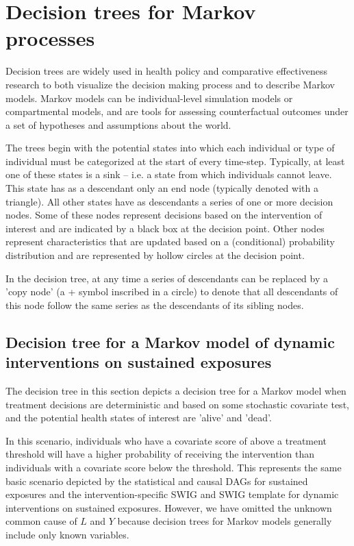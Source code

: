 \documentclass[a4paper]{report}
\begin{document}
\begin{framed}
\begin{Verbatim}
\end{Verbatim}

\end{framed}

\vspace{3mm}

\chapter{Decision trees for Markov processes}
Decision trees are widely used in health policy and comparative effectiveness research to both visualize the decision making process and to describe Markov models. Markov models can be individual-level simulation models or compartmental models, and are tools for assessing counterfactual outcomes under a set of hypotheses and assumptions about the world. 

The trees begin with the potential states into which each individual or type of individual must be categorized at the start of every time-step. Typically, at least one of these states is a sink -- i.e. a state from which individuals cannot leave. This state has as a descendant only an end node (typically denoted with a triangle). All other states have as descendants a series of one or more decision nodes. Some of these nodes represent decisions based on the intervention of interest and are indicated by a black box at the decision point. Other nodes represent characteristics that are updated based on a (conditional) probability distribution and are represented by hollow circles at the decision point. 

In the decision tree, at any time a series of descendants can be replaced by a 'copy node' (a + symbol inscribed in a circle) to denote that all descendants of this node follow the same series as the descendants of its sibling nodes. 


\vspace{3mm}

\section{Decision tree for a Markov model of dynamic interventions on sustained exposures}

The decision tree in this section depicts a decision tree for a Markov model when treatment decisions are deterministic and based on some stochastic covariate test, and the potential health states of interest are 'alive' and 'dead'. 

In this scenario, individuals who have a covariate score of above a treatment threshold will have a higher probability of receiving the intervention than individuals with a covariate score below the threshold. This represents the same basic scenario depicted by the statistical and causal DAGs for sustained exposures and the intervention-specific SWIG and SWIG template for dynamic interventions on sustained exposures. However, we have omitted the unknown common cause of $L$ and $Y$ because decision trees for Markov models generally include only known variables.
\end{document}
